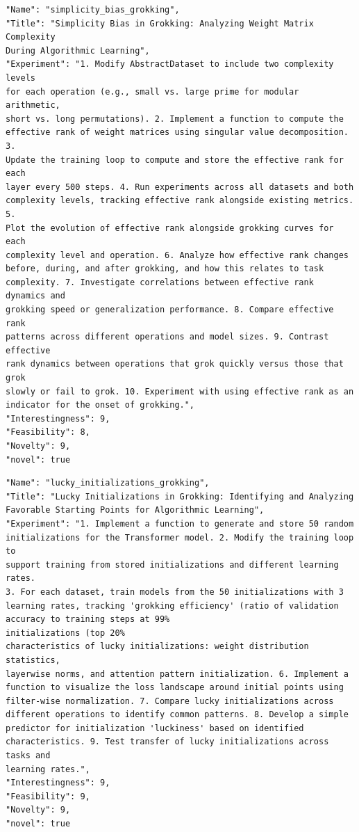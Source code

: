 \documentclass[11pt, a4paper]{include/gdm_format}
\begin{document}
\begin{tcolorbox}[breakable,colback=blue!5!white, colframe=blue!75!black, title=Idea 33/50 - \texttt{simplicity\_bias\_grokking}]
\small
\begin{verbatim}
"Name": "simplicity_bias_grokking",
"Title": "Simplicity Bias in Grokking: Analyzing Weight Matrix Complexity
During Algorithmic Learning",
"Experiment": "1. Modify AbstractDataset to include two complexity levels
for each operation (e.g., small vs. large prime for modular arithmetic,
short vs. long permutations). 2. Implement a function to compute the
effective rank of weight matrices using singular value decomposition. 3.
Update the training loop to compute and store the effective rank for each
layer every 500 steps. 4. Run experiments across all datasets and both
complexity levels, tracking effective rank alongside existing metrics. 5.
Plot the evolution of effective rank alongside grokking curves for each
complexity level and operation. 6. Analyze how effective rank changes
before, during, and after grokking, and how this relates to task
complexity. 7. Investigate correlations between effective rank dynamics and
grokking speed or generalization performance. 8. Compare effective rank
patterns across different operations and model sizes. 9. Contrast effective
rank dynamics between operations that grok quickly versus those that grok
slowly or fail to grok. 10. Experiment with using effective rank as an
indicator for the onset of grokking.",
"Interestingness": 9,
"Feasibility": 8,
"Novelty": 9,
"novel": true
\end{verbatim}
\end{tcolorbox}

\begin{tcolorbox}[breakable,colback=blue!5!white, colframe=blue!75!black, title=Idea 34/50 - \texttt{lucky\_initializations\_grokking}]
\small
\begin{verbatim}
"Name": "lucky_initializations_grokking",
"Title": "Lucky Initializations in Grokking: Identifying and Analyzing
Favorable Starting Points for Algorithmic Learning",
"Experiment": "1. Implement a function to generate and store 50 random
initializations for the Transformer model. 2. Modify the training loop to
support training from stored initializations and different learning rates.
3. For each dataset, train models from the 50 initializations with 3
learning rates, tracking 'grokking efficiency' (ratio of validation
accuracy to training steps at 99%
initializations (top 20%
characteristics of lucky initializations: weight distribution statistics,
layerwise norms, and attention pattern initialization. 6. Implement a
function to visualize the loss landscape around initial points using
filter-wise normalization. 7. Compare lucky initializations across
different operations to identify common patterns. 8. Develop a simple
predictor for initialization 'luckiness' based on identified
characteristics. 9. Test transfer of lucky initializations across tasks and
learning rates.",
"Interestingness": 9,
"Feasibility": 9,
"Novelty": 9,
"novel": true
\end{verbatim}
\end{tcolorbox}
\end{document}
